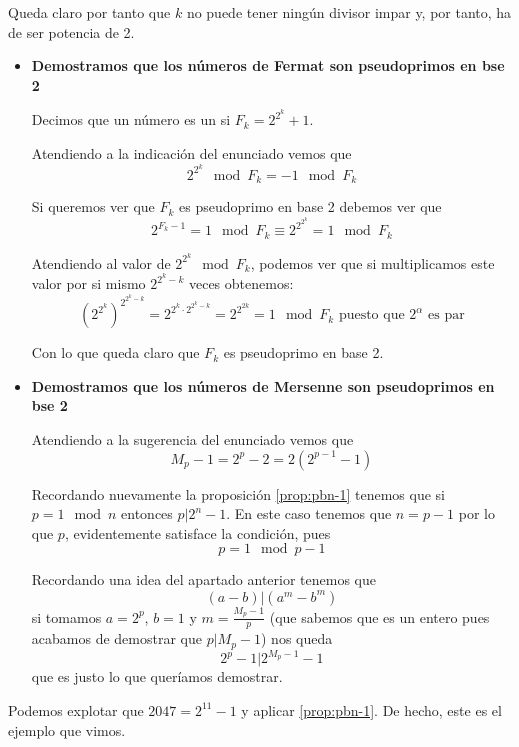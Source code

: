 \begin{problem}[10]
\begin{itemize}
Queda claro por tanto que $k$ no puede tener ningún divisor impar y, por tanto, ha de ser potencia de 2.
\end{itemize}
\spart

\begin{itemize}
\item \textbf{Demostramos que los números de Fermat son pseudoprimos en bse 2}

Decimos que un número es un  si $F_k=2^{2^k}+1$.

Atendiendo a la indicación del enunciado vemos que
\[2^{2^k} \mod F_k = -1 \mod F_k\]

Si queremos ver que $F_k$ es pseudoprimo en base 2 debemos ver que
\[2^{F_k-1} = 1 \mod F_k \equiv 2^{2^{2^k}} = 1 \mod F_k\]

Atendiendo al valor de $2^{2^k} \mod F_k$, podemos ver que si multiplicamos este valor por si mismo $2^{2^k-k}$ veces obtenemos:
\[\left(2^{2^k}\right)^{2^{2^k-k}} = 2^{2^k\cdot 2^{2^k-k}} = 2^{2^{2k}} = 1 \mod F_k \text{ puesto que } 2^α \text{ es par}\]

Con lo que queda claro que $F_k$ es pseudoprimo en base 2.

\item \textbf{Demostramos que los números de Mersenne son pseudoprimos en bse 2}

Atendiendo a la sugerencia del enunciado vemos que
\[M_p-1=2^{p}-2=2(2^{p-1}-1)\]

Recordando nuevamente la proposición \ref{prop:pbn-1} tenemos que si $p=1 \mod n$ entonces $p|2^n-1$. En este caso tenemos que $n=p-1$ por lo que $p$, evidentemente satisface la condición, pues
\[p = 1 \mod p-1\]

Recordando una idea del apartado anterior tenemos que
\[(a-b)|(a^m-b^m)\]
si tomamos $a=2^p$, $b=1$ y $m=\frac{M_p-1}{p}$ (que sabemos que es un entero pues acabamos de demostrar que $p|M_p-1$) nos queda
\[2^p-1 | 2^{M_p-1}-1\]
que es justo lo que queríamos demostrar.

\end{itemize}


\spart

Podemos explotar que $2047 = 2^{11} - 1$ y aplicar \ref{prop:pbn-1}. De hecho, este es el ejemplo que vimos.
\end{problem}



